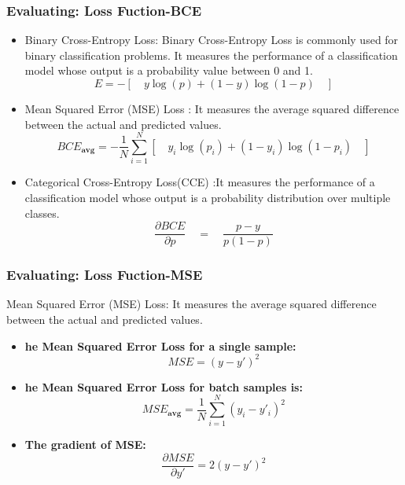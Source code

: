 \documentclass[aspectratio=1610]{beamer}
\begin{document}
\begin{frame}
    \frametitle{Evaluating: Loss Fuction-BCE}
    \begin{itemize}

        \item Binary Cross-Entropy Loss: Binary Cross-Entropy Loss is commonly used for binary classification problems. It measures the performance of a classification model whose output is a probability value between 0 and 1.    
            \[
              E = -\left[\quad y \log(p) + (1 - y) \log(1 - p) \quad\right]
            \]

        \item Mean Squared Error (MSE) Loss  : It measures the average squared difference between the actual and predicted values.
            \[
                BCE_{\textbf{avg}} = - \frac{1}{N} \sum_{i=1}^{N} \left[\quad y_i \log(p_i) + (1 - y_i) \log(1 - p_i) \quad\right]
            \]
        \item Categorical Cross-Entropy Loss(CCE) :It measures the performance of a classification model whose output is a probability distribution over multiple classes. 
            \[
            \frac{\partial BCE }{\partial p}  \quad=\quad \frac{p-y }{p(1-p)} \]
    \end{itemize}
\end{frame}

\begin{frame}
    \frametitle{Evaluating: Loss Fuction-MSE}
    Mean Squared Error (MSE) Loss: 
    It measures the average squared difference between the actual and predicted values. 
    \vspace{0.5cm}
    \begin{itemize}

        \item \textbf{he Mean Squared Error Loss for a single sample:}
        \[
            MSE = (y - y')^2
        \]

        \item \textbf{he Mean Squared Error Loss for batch samples is:}
        \[
        MSE_{\textbf{avg}}= \frac{1}{N} \sum_{i=1}^{N} (y_i - y'_i)^2
        \]
        \item \textbf{The gradient of MSE:}
       \[
       \frac{\partial MSE}{\partial y'} =  2(y-y')^2
       \]
    \end{itemize}
\end{frame}
\end{document}
